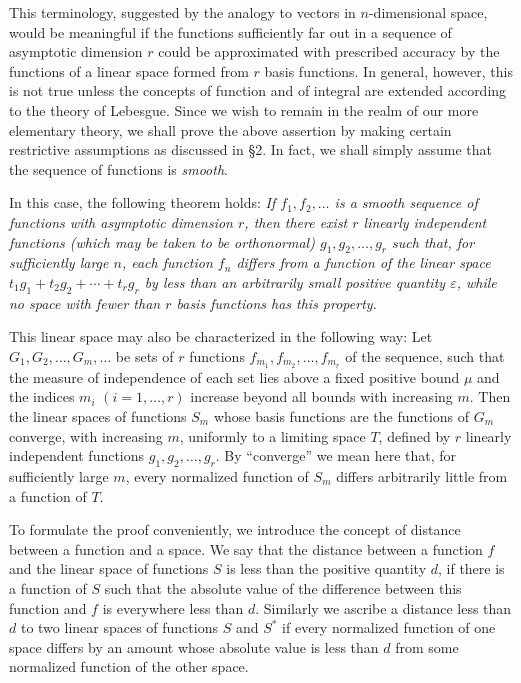 This terminology, suggested by the analogy to vectors in $n$-dimensional space, would be meaningful if the functions sufficiently far out in a sequence of asymptotic dimension $r$ could be approximated with prescribed accuracy by the functions of a linear space formed from $r$ basis functions. In general, however, this is not true unless the concepts of function and of integral are extended according to the theory of Lebesgue. Since we wish to remain in the realm of our more elementary theory, we shall prove the above assertion by making certain restrictive assumptions as discussed in \S2. In fact, we shall simply assume that the sequence of functions is \emph{smooth}.

In this case, the following theorem holds: \emph{If $f_1,f_2,\ldots$ is a smooth sequence of functions with asymptotic dimension $r$, then there exist $r$ linearly independent functions (which may be taken to be orthonormal) $g_1,g_2,\ldots,g_r$ such that, for sufficiently large $n$, each function $f_n$ differs from a function of the linear space $t_1g_1+t_2g_2+\cdots+t_rg_r$ by less than an arbitrarily small positive quantity $\varepsilon$, while no space with fewer than $r$ basis functions has this property.}

This linear space may also be characterized in the following way: Let $G_1,G_2,\ldots,G_m,\ldots$ be sets of $r$ functions $f_{m_1},f_{m_2},\ldots,f_{m_r}$ of the sequence, such that the measure of independence of each set lies above a fixed positive bound $\mu$ and the indices $m_i$ $(i=1,\ldots,r)$ increase beyond all bounds with increasing $m$. Then the linear spaces of functions $S_m$ whose basis functions are the functions of $G_m$ converge, with increasing $m$, uniformly to a limiting space $T$, defined by $r$ linearly independent functions $g_1,g_2,\ldots,g_r$. By ``converge'' we mean here that, for sufficiently large $m$, every normalized function of $S_m$ differs arbitrarily little from a function of $T$.

To formulate the proof conveniently, we introduce the concept of distance between a function and a space. We say that the distance between a function $f$ and the linear space of functions $S$ is less than the positive quantity $d$, if there is a function of $S$ such that the absolute value of the difference between this function and $f$ is everywhere less than $d$. Similarly we ascribe a distance less than $d$ to two linear spaces of functions $S$ and $S^*$ if every normalized function of one space differs by an amount whose absolute value is less than $d$ from some normalized function of the other space.

